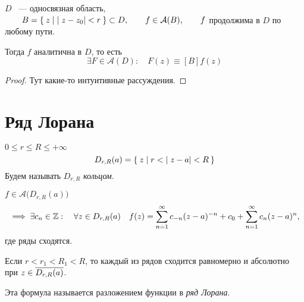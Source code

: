\begin{theorem}
	$ D $ ~--- односвязная область, $ \qquad B = \Set{z \mid |z - z_0| < r} \subset D, \qquad f \in \mathcal A(B), \qquad f $ продолжима в $ D $ по любому пути.

	Тогда $ f $ аналитична в $ D $, то есть
	$$ \exists F \in \mathcal A(D) : \quad F(z) \equiv[B] f(z) $$
\end{theorem}

\begin{proof}
	Тут какие-то интуитивные рассуждения.
\end{proof}

\section{Ряд Лорана}

\begin{definition}
	$ 0 \le r \le R \le +\infty $
	$$ D_{r, R}(a) = \Set{z \mid r < |z - a| < R} $$
	Будем называть $ D_{r, R} $ \emph{кольцом}.
\end{definition}

\begin{theorem}
	$ f \in \mathcal A \big(D_{r, R}(a) \big) $
	$$ \implies \exists c_n \in \mathbb{Z} : \quad \forall z \in D_{r, R}(a) \quad f(z) = \sum_{n = 1}^\infty c_{-n}(z - a)^{-n} + c_0 + \sum_{n = 1}^\infty c_n(z - a)^n, $$
	где ряды сходятся.

	Если $ r < r_1 < R_1 < R $, то каждый из рядов сходится равномерно и абсолютно при $ z \in \overline{D_{r, R}(a)} $.

	Эта формула называется разложением функции в \emph{ряд Лорана}.
\end{theorem}

